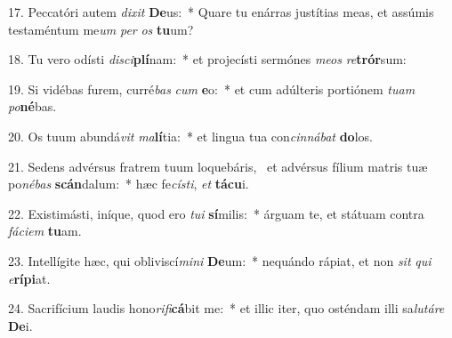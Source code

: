 17. Peccatóri autem \textit{di}\textit{xit} \textbf{De}us:~*  Quare tu enárras justítias meas, et assúmis testaméntum me\textit{um} \textit{per} \textit{os} \textbf{tu}um?\

18. Tu vero odísti \textit{di}\textit{sci}\textbf{plí}nam:~*  et projecísti sermónes \textit{me}\textit{os} \textit{re}\textbf{trór}sum:\

19. Si vidébas furem, curré\textit{bas} \textit{cum} \textbf{e}o:~*  et cum adúlteris portiónem \textit{tu}\textit{am} \textit{po}\textbf{né}bas.\

20. Os tuum abundá\textit{vit} \textit{ma}\textbf{lí}tia:~*  et lingua tua con\textit{cin}\textit{ná}\textit{bat} \textbf{do}los.\

21. Sedens advérsus fratrem tuum loquebáris, \dag\  et advérsus fílium matris tuæ po\textit{né}\textit{bas} \textbf{scán}dalum:~*  hæc fe\textit{cís}\textit{ti}, \textit{et} \textbf{tá}\textbf{cu}i.\

22. Existimásti, iníque, quod ero \textit{tu}\textit{i} \textbf{sí}milis:~*  árguam te, et státuam contra \textit{fá}\textit{ci}\textit{em} \textbf{tu}am.\

23. Intellígite hæc, qui obliviscí\textit{mi}\textit{ni} \textbf{De}um:~*  nequándo rápiat, et non \textit{sit} \textit{qui} \textit{e}\textbf{rí}\textbf{pi}at.\

24. Sacrifícium laudis hono\textit{ri}\textit{fi}\textbf{cá}bit me:~*  et illic iter, quo osténdam illi sa\textit{lu}\textit{tá}\textit{re} \textbf{De}i.\

